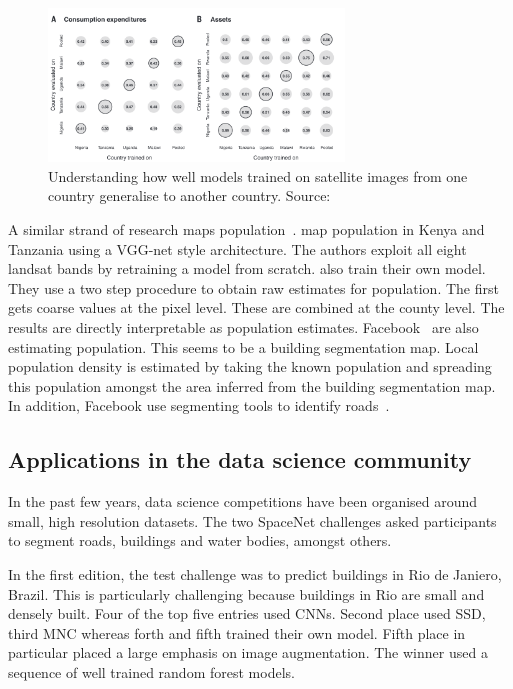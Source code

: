 \documentclass[12pt, a4paper, oneside, headinclude, footinclude]{article}
\begin{document}
\begin{figure}
    \centering
\includegraphics[width=0.7\textwidth]{transfer-learning-poverty.png}
    \caption[Transfer learning for CNNs used for poverty
    estimation]{Understanding how well models trained on satellite images from
    one country generalise to another country. Source:~\cite{Jean79}\label{fig:transfer}}
\end{figure}

A similar strand of research maps population~\cite{doupe2016, robinson2017}.
\cite{doupe2016} map population in Kenya and Tanzania using a VGG-net style
architecture. The authors exploit all eight landsat bands by retraining a
model from scratch. \cite{robinson2017} also train their
own model. They use a two step procedure to obtain raw estimates for
population. The first gets coarse values at the pixel level. These are
combined at the county level. The results are directly interpretable as
population estimates. Facebook~\cite{facebook} are also estimating
population. This seems to be a building segmentation map. Local population
density is estimated by taking the known population and spreading this
population amongst the area inferred from the building segmentation map.  In
addition, Facebook use segmenting tools to identify roads~\cite{demir2018}.

\subsection{Applications in the data science community}

In the past few years, data science
competitions have been organised around small, high resolution datasets. The
two SpaceNet challenges asked participants to segment roads, buildings and
water bodies, amongst others.

In the first edition, the test challenge was to predict buildings in Rio de
Janiero, Brazil. This is particularly challenging because buildings in Rio are
small and densely built. Four of the top five entries used CNNs. Second
place used SSD, third MNC whereas forth and fifth trained their own model.
Fifth place in particular placed a large emphasis on image augmentation. The
winner used a sequence of well trained random forest models.
\end{document}
